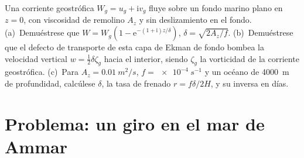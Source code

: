 \begin{exercise}[$\star\star\star$]\label{exo:b3:ocean-dynamics:12}
Una corriente geostrófica $W_g = u_g + \mathrm iv_g$ fluye sobre un fondo marino
plano en $z = 0$, con viscosidad de remolino $A_z$ y sin deslizamiento en el fondo.
(a)~Demuéstrese que $W = W_g(1 - \mathrm e^{-(1+\mathrm i)z/\delta})$, $\delta =
\sqrt{2A_z/f}$. (b)~Demuéstrese que el defecto de transporte de esta capa de Ekman de fondo
bombea la velocidad vertical $w = \tfrac12\delta\zeta_g$ hacia el
interior, siendo $\zeta_g$ la vorticidad de la corriente geostrófica. (c)~Para
$A_z = \qty{0.01}{m^2/s}$, $f = \qty{e-4}{s^{-1}}$ y un océano
de \qty{4000}{m} de profundidad, calcúlese $\delta$, la tasa de frenado $r =
f\delta/2H$, y su inversa en días.
\end{exercise}

\section{Problema: un giro en el mar de Ammar}

